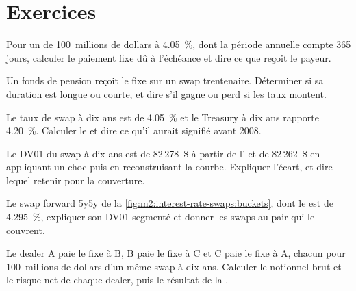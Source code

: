 \section{Exercices}

\begin{exercise}[$\star$]\label{exo:m2:interest-rate-swaps:1}
Pour un  de 100~millions de dollars à 4.05~\%, dont la période annuelle compte 365 jours,
calculer le paiement fixe dû à l'échéance et dire ce que reçoit le payeur.
\end{exercise}

\begin{exercise}[$\star$]\label{exo:m2:interest-rate-swaps:2}
Un fonds de pension reçoit le fixe sur un swap trentenaire. Déterminer si sa duration est
longue ou courte, et dire s'il gagne ou perd si les taux montent.
\end{exercise}

\begin{exercise}[$\star$]\label{exo:m2:interest-rate-swaps:3}
Le taux de swap à dix ans est de 4.05~\% et le Treasury à dix ans rapporte 4.20~\%. Calculer le  et
dire ce qu'il aurait signifié avant 2008.
\end{exercise}

\begin{exercise}[$\star\star$]\label{exo:m2:interest-rate-swaps:4}
Le DV01 du swap à dix ans est de 82\,278~\$ à partir de l' et de 82\,262~\$ en appliquant un choc
puis en reconstruisant la courbe. Expliquer l'écart, et dire lequel retenir pour la couverture.
\end{exercise}

\begin{exercise}[$\star\star$]\label{exo:m2:interest-rate-swaps:5}
Le swap forward 5y5y de la \cref{fig:m2:interest-rate-swaps:buckets}, dont le  est de 4.295~\%,
expliquer son DV01 segmenté et donner les swaps au pair qui le couvrent.
\end{exercise}

\begin{exercise}[$\star\star$]\label{exo:m2:interest-rate-swaps:6}
Le dealer A paie le fixe à B, B paie le fixe à C et C paie le fixe à A, chacun pour
100~millions de dollars d'un même swap à dix ans. Calculer le notionnel brut et le risque net de chaque dealer,
puis le résultat de la .
\end{exercise}

